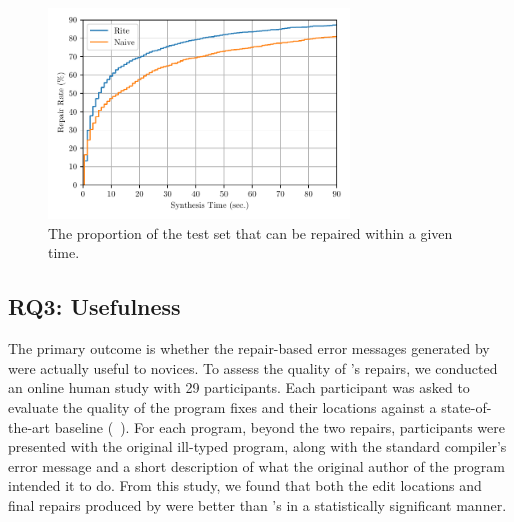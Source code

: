
\begin{figure}
  \centering
  \includegraphics[height=2.2in]{cdf.pdf}
  \caption{The proportion of the test set that can be repaired within a given time.}
  \label{fig:rite_naive}
\end{figure}

\subsection{RQ3: Usefulness}
\label{sec:eval:useful}

The primary outcome is whether the repair-based
error messages generated by \toolname were actually useful to novices.
%
To assess the quality of \toolname's repairs, we conducted an online human
study with 29 participants.
%
Each participant was asked to evaluate the quality of the program fixes
and their locations against a state-of-the-art baseline
(\seminal ~\citep{Lerner2007-dt}).
%
For each program, beyond the two repairs, participants were presented
with the original ill-typed program, along with the standard \ocaml
compiler's error message and a short description of what the original
author of the program intended it to do.
%
From this study, we found that both the edit locations and final
repairs produced by \toolname were better than
\seminal's in a statistically significant manner.

